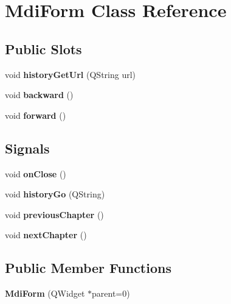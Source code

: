 \hypertarget{classMdiForm}{
\section{MdiForm Class Reference}
\label{classMdiForm}
}
\subsection*{Public Slots}
\begin{DoxyCompactItemize}
\item 
\hypertarget{classMdiForm_ad242fd59e33d464fd998ac3e5726e6c5}{
void {\bfseries historyGetUrl} (QString url)}
\label{classMdiForm_ad242fd59e33d464fd998ac3e5726e6c5}

\item 
\hypertarget{classMdiForm_adcd130f56a1ff035a7ede2a4a6f4a349}{
void {\bfseries backward} ()}
\label{classMdiForm_adcd130f56a1ff035a7ede2a4a6f4a349}

\item 
\hypertarget{classMdiForm_a51b90971cd201a0581821da568eb6016}{
void {\bfseries forward} ()}
\label{classMdiForm_a51b90971cd201a0581821da568eb6016}

\end{DoxyCompactItemize}
\subsection*{Signals}
\begin{DoxyCompactItemize}
\item 
\hypertarget{classMdiForm_a307be9172628f35975d431aee88b0e98}{
void {\bfseries onClose} ()}
\label{classMdiForm_a307be9172628f35975d431aee88b0e98}

\item 
\hypertarget{classMdiForm_a1aff8fea304ddeae0742a10fdc14b6a2}{
void {\bfseries historyGo} (QString)}
\label{classMdiForm_a1aff8fea304ddeae0742a10fdc14b6a2}

\item 
\hypertarget{classMdiForm_a73526724ba085b3abf6f3ba65c0607c8}{
void {\bfseries previousChapter} ()}
\label{classMdiForm_a73526724ba085b3abf6f3ba65c0607c8}

\item 
\hypertarget{classMdiForm_afead4ab757a160f39438d516840a69ec}{
void {\bfseries nextChapter} ()}
\label{classMdiForm_afead4ab757a160f39438d516840a69ec}

\end{DoxyCompactItemize}
\subsection*{Public Member Functions}
\begin{DoxyCompactItemize}
\item 
\hypertarget{classMdiForm_af490eec216c272053d52e10896b27153}{
{\bfseries MdiForm} (QWidget $\ast$parent=0)}
\label{classMdiForm_af490eec216c272053d52e10896b27153}

\end{DoxyCompactItemize}
